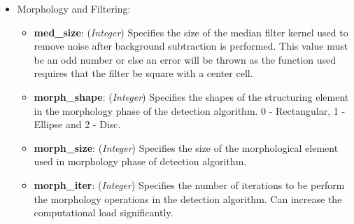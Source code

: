 \begin{itemize}
\item Morphology and Filtering:
    \begin{itemize}
        \item\textbf{med\_size}: (\emph{Integer}) Specifies the size of the median filter kernel used to remove noise after background subtraction is performed. This value must be an odd number or else an error will be thrown as the function used requires that the filter be square with a center cell.   
        \item\textbf{morph\_shape}: (\emph{Integer}) Specifies the shapes of the structuring element in the morphology phase of the detection algorithm. 0 - Rectangular, 1 - Ellipse and 2 - Disc. 
        \item\textbf{morph\_size}: (\emph{Integer}) Specifies the size of the morphological element used in morphology phase of detection algorithm.
        \item\textbf{morph\_iter}: (\emph{Integer}) Specifies the number of iterations to be perform the morphology operations in the detection algorithm. Can increase the computational load significantly. 
    \end{itemize}


\end{itemize}

